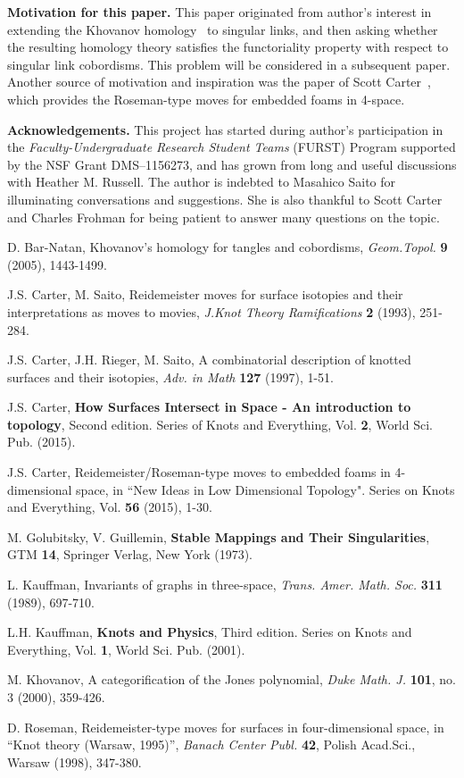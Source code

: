 \documentclass{amsart}\usepackage{amsfonts, amsmath, amssymb}\usepackage{graphicx, epic, epsf, enumerate, stmaryrd}
\theoremstyle{definition}
\numberwithin{equation}{section}
\begin{document}
\textbf{Motivation for this paper.} This paper originated from author's interest in extending the Khovanov homology~\cite{Kh} to singular links, and then asking whether the resulting homology theory satisfies the functoriality property with respect to singular link cobordisms. This problem will be considered in a subsequent paper. Another source of motivation and inspiration was the paper of Scott Carter~\cite{Ca0}, which provides the Roseman-type moves for embedded foams in 4-space.

\textbf{Acknowledgements.} 
This project has started during author's participation in the \textit{Faculty-Undergraduate Research Student Teams} (FURST) Program supported by the NSF Grant DMS--1156273, and has grown from long and useful discussions with Heather M. Russell. The author is indebted to Masahico Saito for illuminating conversations and suggestions. She is also thankful to Scott Carter and Charles Frohman for being patient to answer many questions on the topic.

\begin{thebibliography}{999}

 D. Bar-Natan, Khovanov's homology for tangles and cobordisms, {\em Geom.Topol.} \textbf{9} (2005), 1443-1499.

 J.S. Carter, M. Saito, Reidemeister moves for surface isotopies and their interpretations as moves to movies, {\em J.Knot Theory Ramifications} \textbf{2} (1993), 251-284.

 J.S. Carter, J.H. Rieger, M. Saito, A combinatorial description of knotted surfaces and their isotopies, {\em Adv. in Math} \textbf{127} (1997), 1-51.

 J.S. Carter, \textbf{How Surfaces Intersect in Space - An introduction to topology}, Second edition. Series of Knots and Everything, Vol. \textbf{2}, World Sci. Pub. (2015).

 J.S. Carter, Reidemeister/Roseman-type moves to embedded foams in 4-dimensional space,  in ``New Ideas in Low Dimensional Topology".  Series on Knots and Everything, Vol. \textbf{56} (2015), 1-30.

 M. Golubitsky, V. Guillemin, \textbf{Stable Mappings and Their Singularities}, GTM \textbf{14}, Springer Verlag, New York (1973).

 L. Kauffman, Invariants of graphs in three-space, {\em Trans. Amer. Math. Soc.} \textbf{311} (1989), 697-710. 

 L.H. Kauffman, \textbf{Knots and Physics}, Third edition. Series on Knots and Everything, Vol. \textbf{1}, World Sci. Pub. (2001).

 M. Khovanov, A categorification of the Jones polynomial, {\em Duke Math. J.} \textbf {101}, no. 3 (2000), 359-426. 

 D. Roseman, Reidemeister-type moves for surfaces in four-dimensional space, in ``Knot theory (Warsaw, 1995)'', \textit{Banach Center Publ.} \textbf{42}, Polish Acad.Sci., Warsaw (1998), 347-380.

\end{thebibliography}
\end{document}
